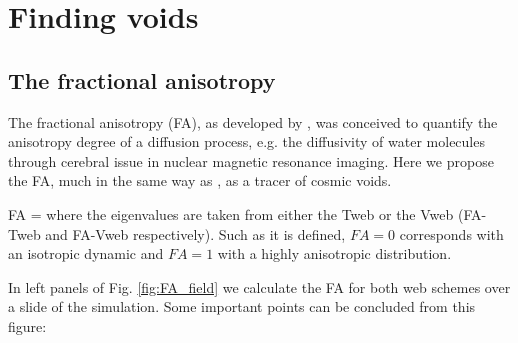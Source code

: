 \documentclass[a4,useAMS,usenatbib,usegraphicx]{latex/mn2e}
\begin{document}
\section{Finding voids}
\label{sec:bulk_voids}


\subsection{The fractional anisotropy}
\label{subsec:FA_voids}


The fractional anisotropy (FA), as developed by \citet{Basser95}, was 
conceived to quantify the anisotropy degree of a diffusion process, e.g. 
the diffusivity of water molecules through cerebral issue in nuclear
magnetic resonance imaging. Here we propose the FA, much in the same 
way as \citet{Libeskind13}, as a tracer of cosmic voids.


{ FA =  }
where the eigenvalues are taken from either the Tweb or the Vweb 
(FA-Tweb and FA-Vweb respectively). Such as it is defined, $FA=0$ 
corresponds with an isotropic dynamic and $FA=1$ with a highly anisotropic 
distribution.


In left panels of Fig. \ref{fig:FA_field} we calculate the FA for both 
web schemes over a slide of the simulation. Some important points can be 
concluded from this figure:
\end{document}

